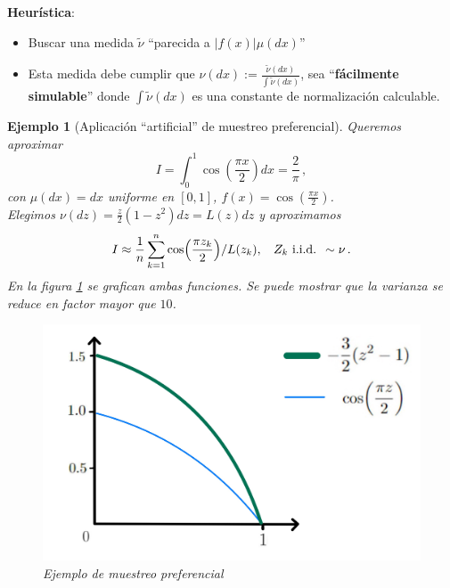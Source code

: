 \documentclass[letterpaper,11pt]{article} %
\def\espacio{\hspace{.25cm}\,}
\theoremstyle{defbreak}
\newtheorem{example}{Ejemplo}[subsection]
\theoremstyle{propbreak}
\theoremstyle{remark}
\theoremstyle{break}
\def\iid{\mbox{ i.i.d. }}
\begin{document}
\newp \textbf{Heurística}:
\begin{itemize}
    \item Buscar una medida $\tilde{\nu}$ ``parecida a $|f(x)|\mu(dx)$''
    \item Esta medida debe cumplir que $\nu(dx):=\displaystyle\frac{\tilde\nu(dx)}{\int\tilde{\nu}(dx)}$, sea ``\textbf{fácilmente simulable}'' donde $\int\tilde{\nu}(dx)$ es una constante de normalización calculable. 
\end{itemize}
\begin{example}[Aplicación ``artificial'' de muestreo preferencial]
Queremos aproximar $$I=\displaystyle\int^1_0\cos(\frac{\pi x}{2})dx=\frac{2}{\pi} \, ,$$ con $\mu(dx)=dx$ uniforme en $[0,1]$, $f(x)=\cos(\frac{\pi x}{2})$.\\
\newline Elegimos $\nu(dz)=\frac{z}{2}(1-z^2)dz=L(z)dz$ y aproximamos
$$ I\approx\displaystyle\frac{1}{n}\sum^n_{k=1}\cos(\frac{\pi z_k}{2})/L(z_k), \espacio Z_k \iid \sim \nu \, .$$
En la figura \ref{fig:pref} se grafican ambas funciones. Se puede mostrar que la varianza se reduce en factor mayor que $10$.
\begin{figure}
    \centering
    \includegraphics[scale=0.12]{img/clase_08_pag_11.jpg}
    \caption{Ejemplo de muestreo preferencial}
    \label{fig:pref}
\end{figure}
\end{example}
\end{document}
